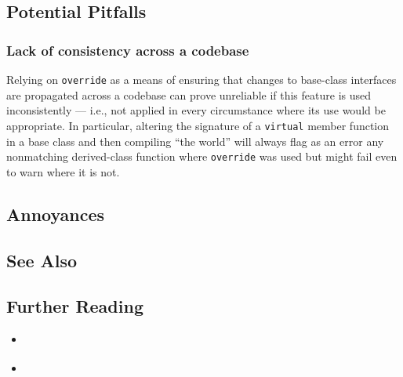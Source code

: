 \subsection[Potential Pitfalls]{Potential Pitfalls}\label{potential-pitfalls}

\subsubsection[Lack of consistency across a codebase]{Lack of consistency across a codebase}\label{lack-of-consistency-across-a-codebase}

Relying on \lstinline!override! as a means of ensuring that changes to
base-class interfaces are propagated across a codebase can prove
unreliable if this feature is used inconsistently --- i.e., not applied in every circumstance where its use would be appropriate. In
particular, altering the signature of a \lstinline!virtual! member function
in a base class and then compiling ``the world'' will always flag as an
error any nonmatching derived-class function where \lstinline!override!
was used but might fail even to warn where it is not.

\subsection[Annoyances]{Annoyances}\label{annoyances}

\hspace*{\fill}

\subsection[See Also]{See Also}\label{see-also}

\hspace*{\fill}

\subsection[Further Reading]{Further Reading}\label{further-reading}

\begin{itemize}
\item{\cite{meyers15b}}
\item{\cite{fluentcpp}}
\end{itemize}


